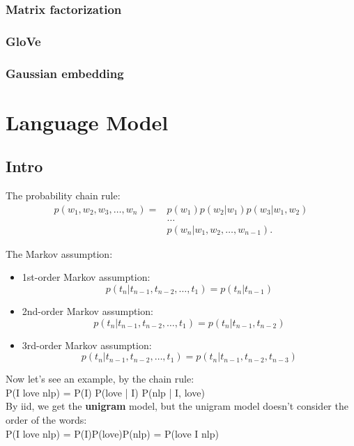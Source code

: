 \documentclass{report}
\begin{document}
\subsection{Matrix factorization}
\subsection{GloVe}
\subsection{Gaussian embedding}

\chapter{Language Model}
\section{Intro}
\noindent The probability chain rule: \\
\begin{align*}
	p(w_1, w_2, w_3, \ldots, w_n) = &p (w_1) p(w_2 | w_1) p(w_3 | w_1, w_2)  \\ & \ldots \\ & p(w_n | w_1, w_2,\ldots,w_{n-1})
.\end{align*}

\noindent The Markov assumption:
\begin{itemize}
	\item 1st-order Markov assumption: \[
			p(t_n | t_{n-1}, t_{n-2}, \ldots, t_1) = p(t_n | t_{n-1})
	\] 
	\item 2nd-order Markov assumption: \[
			p(t_n | t_{n-1}, t_{n-2}, \ldots, t_1) = p(t_n | t_{n-1}, t_{n-2})
	\] 
	\item 3rd-order Markov assumption: \[
			p(t_n | t_{n-1}, t_{n-2}, \ldots, t_1) = p(t_n | t_{n-1}, t_{n-2}, t_{n-3})
	\] 
\end{itemize}

\noindent Now let's see an example, by the chain rule:\\
\linebreak
	P(I love nlp) = P(I) P(love | I) P(nlp | I, love)\\
	\linebreak
	By iid, we get the \textbf{unigram} model, but the unigram model doesn't consider the order of the words:\\
{\center
P(I love nlp) = P(I)P(love)P(nlp)} = P(love I nlp)\\
\end{document}
